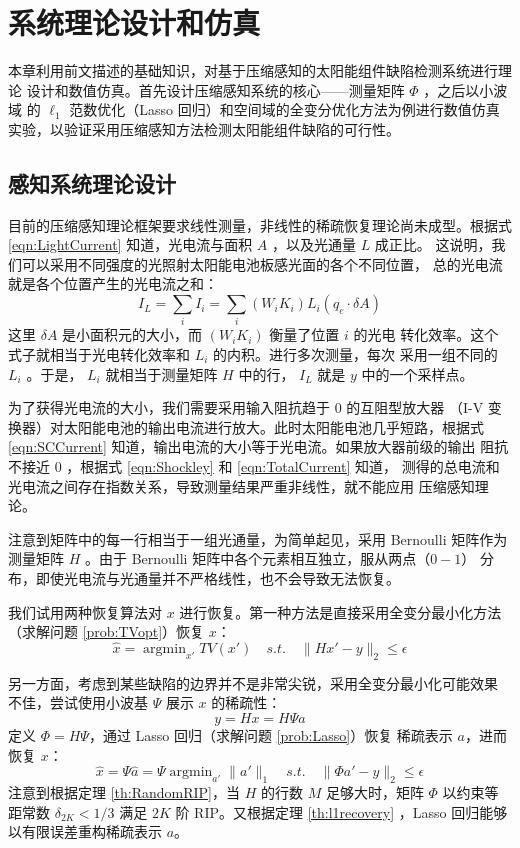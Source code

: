 \chapter{系统理论设计和仿真}

本章利用前文描述的基础知识，对基于压缩感知的太阳能组件缺陷检测系统进行理论
设计和数值仿真。首先设计压缩感知系统的核心——测量矩阵 $\Phi$ ，之后以小波域
的 $\ell_1$ 范数优化（Lasso 回归）和空间域的全变分优化方法为例进行数值仿真
实验，以验证采用压缩感知方法检测太阳能组件缺陷的可行性。

\section{感知系统理论设计}

目前的压缩感知理论框架要求线性测量，非线性的稀疏恢复理论尚未成型。根据式
\ref{eqn:LightCurrent} 知道，光电流与面积 $A$ ，以及光通量 $L$ 成正比。
这说明，我们可以采用不同强度的光照射太阳能电池板感光面的各个不同位置，
总的光电流就是各个位置产生的光电流之和：
\begin{equation}
I_L = \sum_i I_i = \sum_i (W_i K_i)  L_i(q_e \cdot \delta A)
\end{equation}
这里 $\delta A$ 是小面积元的大小，而 $(W_i K_i)$ 衡量了位置 $i$ 的光电
转化效率。这个式子就相当于光电转化效率和 $L_i$ 的内积。进行多次测量，每次
采用一组不同的 $L_i$ 。于是， $L_i$ 就相当于测量矩阵 $H$ 中的行，
$I_L$ 就是 $y$ 中的一个采样点。

为了获得光电流的大小，我们需要采用输入阻抗趋于 $0$ 的互阻型放大器 （I-V
变换器）对太阳能电池的输出电流进行放大。此时太阳能电池几乎短路，根据式
\ref{eqn:SCCurrent} 知道，输出电流的大小等于光电流。如果放大器前级的输出
阻抗不接近 $0$ ，根据式 \ref{eqn:Shockley} 和 \ref{eqn:TotalCurrent} 知道，
测得的总电流和光电流之间存在指数关系，导致测量结果严重非线性，就不能应用
压缩感知理论。

注意到矩阵中的每一行相当于一组光通量，为简单起见，采用 Bernoulli 矩阵作为
测量矩阵 $H$ 。由于 Bernoulli 矩阵中各个元素相互独立，服从两点（$0-1$）
分布，即使光电流与光通量并不严格线性，也不会导致无法恢复。

我们试用两种恢复算法对 $x$ 进行恢复。第一种方法是直接采用全变分最小化方法
（求解问题 \ref{prob:TVopt}）恢复 $x$：
\begin{equation}
\hat x = \mathop{\arg\min}_{x'} TV(x') \quad s.t. \quad
\|Hx' - y\|_2 \leq \epsilon
\end{equation}

另一方面，考虑到某些缺陷的边界并不是非常尖锐，采用全变分最小化可能效果
不佳，尝试使用小波基 $\Psi$ 展示 $x$ 的稀疏性：
\begin{equation}
y = Hx = H\Psi a
\end{equation}
定义 $\Phi = H\Psi$，通过 Lasso 回归（求解问题 \ref{prob:Lasso}）恢复
稀疏表示 $a$，进而恢复 $x$：
\begin{equation}
\hat x = \Psi \hat a = \Psi \mathop{\arg\min}_{a'} \|a'\|_1 \quad s.t.
\quad \|\Phi a' - y\|_2 \leq \epsilon
\end{equation}
注意到根据定理 \ref{th:RandomRIP}，当 $H$ 的行数 $M$ 足够大时，矩阵 $\Phi$
以约束等距常数 $\delta_{2K} < 1/3$ 满足 $2K$ 阶 RIP。又根据定理
\ref{th:l1recovery} ，Lasso 回归能够以有限误差重构稀疏表示 $a$。

